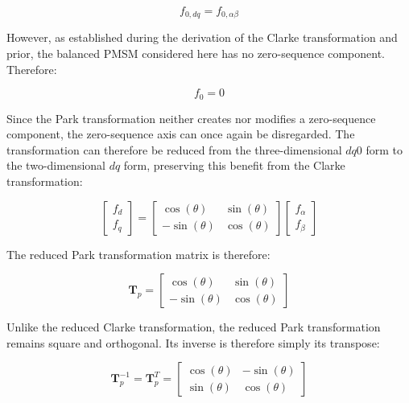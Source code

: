 \documentclass{article}
\begin{document}
\begin{equation}
    f_{0,dq} = f_{0,\alpha\beta}
\end{equation}

However, as established during the derivation of the Clarke transformation and prior, the balanced PMSM considered here has no zero-sequence component. Therefore:

\begin{equation}
    f_0 = 0
\end{equation}

Since the Park transformation neither creates nor modifies a zero-sequence component, the zero-sequence axis can once again be disregarded. The transformation can therefore be reduced from the three-dimensional $dq0$ form to the two-dimensional $dq$ form, preserving this benefit from the Clarke transformation:

\begin{equation}
    \begin{bmatrix}
        f_d \\
        f_q
    \end{bmatrix}
    =
    \begin{bmatrix}
        \cos(\theta) & \sin(\theta) \\
        -\sin(\theta) & \cos(\theta)
    \end{bmatrix}
    \begin{bmatrix}
        f_\alpha \\
        f_\beta
    \end{bmatrix}
\end{equation}

The reduced Park transformation matrix is therefore:

\begin{equation}
    \mathbf{T}_p
    =
    \begin{bmatrix}
        \cos(\theta) & \sin(\theta) \\
        -\sin(\theta) & \cos(\theta)
    \end{bmatrix}
\end{equation}

Unlike the reduced Clarke transformation, the reduced Park transformation remains square and orthogonal. Its inverse is therefore simply its transpose:

\begin{equation}
\label{eqn-inv-park}
    \mathbf{T}_p^{-1}
    =
    \mathbf{T}_p^T
    =
    \begin{bmatrix}
        \cos(\theta) & -\sin(\theta) \\
        \sin(\theta) & \cos(\theta)
    \end{bmatrix}
\end{equation}
\end{document}
